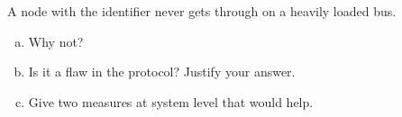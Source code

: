 \label{ex:4:4}
A node with the identifier  never gets through on a heavily loaded bus.
\begin{enumerate}[a)]
  \item Why not?
  \item Is it a flaw in the protocol? Justify your answer.
  \item Give two measures at system level that would help.
\end{enumerate}
